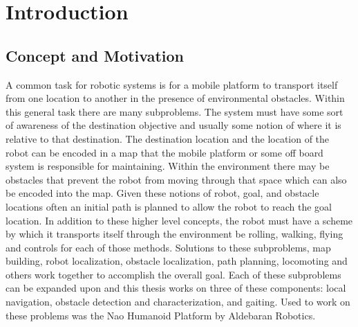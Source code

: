 \chapter{Introduction} \label{ch:introduction}

\section{Concept and Motivation}
A common task for robotic systems is for a mobile platform to transport itself from one location to another
in the presence of environmental obstacles. Within this general task there are many subproblems. The system
must have some sort of awareness of the destination objective and usually some notion of where it is relative
to that destination. The destination location and the location of the robot can be encoded in a map that
the mobile platform or some off board system is responsible for maintaining. Within the environment there may 
be obstacles that prevent the robot from moving through that space which can also be encoded into the map. 
Given these notions of robot, goal, and obstacle locations often an initial path is planned to allow the robot
to reach the goal location. In addition to these higher level concepts, the robot must have a scheme by which it
transports itself through the environment be rolling, walking, flying and controls for each of those methods.
Solutions to these subproblems, map building, robot localization, obstacle localization,
path planning, locomoting and others work together to accomplish the overall goal. 
Each of these subproblems can be expanded upon and this thesis works on three of these components: 
local navigation, obstacle detection and characterization, and gaiting. Used to work on these problems
was the Nao Humanoid Platform by Aldebaran Robotics.

